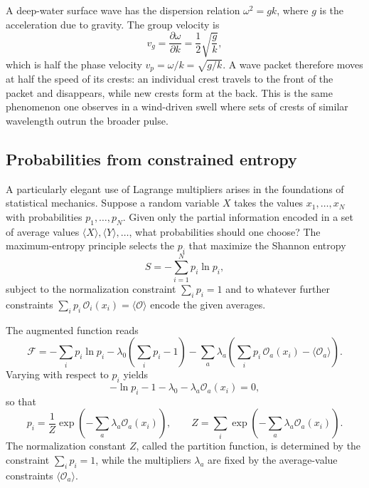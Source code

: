 \begin{example}
A deep-water surface wave has the dispersion relation $\omega^2=gk$, where $g$ is the acceleration due to gravity. The group velocity is
\begin{equation}
v_g=\frac{\partial\omega}{\partial k}=\frac12\sqrt{\frac{g}{k}},
\end{equation}
which is half the phase velocity $v_p=\omega/k=\sqrt{g/k}$. A wave packet therefore moves at half the speed of its crests: an individual crest travels to the front of the packet and disappears, while new crests form at the back. This is the same phenomenon one observes in a wind-driven swell where sets of crests of similar wavelength outrun the broader pulse.
\end{example}

\subsection{Probabilities from constrained entropy}

A particularly elegant use of Lagrange multipliers arises in the foundations of statistical mechanics. Suppose a random variable $X$ takes the values $x_1,\ldots,x_N$ with probabilities $p_1,\ldots,p_N$. Given only the partial information encoded in a set of average values $\langle X\rangle,\langle Y\rangle,\ldots$, what probabilities should one choose? The maximum-entropy principle selects the $p_i$ that maximize the Shannon entropy
\begin{equation}
S=-\sum_{i=1}^N p_i\ln p_i,
\end{equation}
subject to the normalization constraint $\sum_i p_i=1$ and to whatever further constraints $\sum_i p_i\,\mathcal{O}_i(x_i)=\langle\mathcal{O}\rangle$ encode the given averages.

The augmented function reads
\begin{equation}
\mathcal{F}=-\sum_i p_i\ln p_i-\lambda_0\!\left(\sum_i p_i-1\right)-\sum_a\lambda_a\!\left(\sum_i p_i\,\mathcal{O}_a(x_i)-\langle\mathcal{O}_a\rangle\right).
\end{equation}
Varying with respect to $p_i$ yields
\begin{equation}
-\ln p_i-1-\lambda_0-\lambda_a\mathcal{O}_a(x_i)=0,
\end{equation}
so that
\begin{equation}
p_i=\frac{1}{Z}\exp\!\left(-\sum_a\lambda_a\mathcal{O}_a(x_i)\right),
\qquad
Z=\sum_i\exp\!\left(-\sum_a\lambda_a\mathcal{O}_a(x_i)\right).
\end{equation}
The normalization constant $Z$, called the partition function, is determined by the constraint $\sum_i p_i=1$, while the multipliers $\lambda_a$ are fixed by the average-value constraints $\langle\mathcal{O}_a\rangle$.


